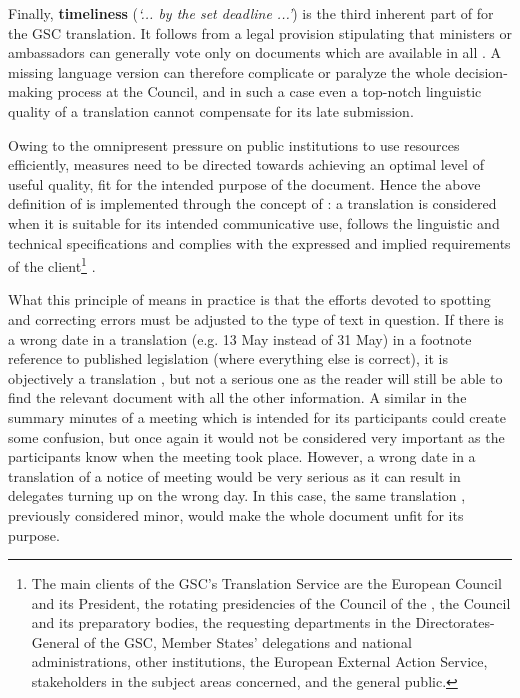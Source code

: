 \documentclass[output=paper]{langsci/langscibook}
\begin{document}
Finally, \textbf{timeliness} (\textit{‘... by the set deadline ...’}) is the third inherent part of  for the GSC translation. It follows from a legal provision stipulating that ministers or ambassadors can generally vote only on documents which are available in all . A missing language version can therefore complicate or paralyze the whole decision-making process at the Council, and in such a case even a top-notch linguistic quality of a translation cannot compensate for its late submission.

Owing to the omnipresent pressure on public institutions to use resources efficiently,  measures need to be directed towards achieving an optimal level of useful quality, fit for the intended purpose of the document. Hence the above definition of  is implemented through the concept of : a translation is considered  when it is suitable for its intended communicative use, follows the linguistic and technical specifications and complies with the expressed and implied requirements of the client\footnote{The main clients of the GSC's Translation Service are the European Council and its President, the rotating presidencies of the Council of the , the Council and its preparatory bodies, the requesting departments in the Directorates-General of the GSC, Member States' delegations and national administrations, other  institutions, the European External Action Service, stakeholders in the subject areas concerned, and the general public.} \citep[36]{Council2015}. 

What this principle of  means in practice is that the efforts devoted to spotting and correcting errors must be adjusted to the type of text in question. If there is a wrong date in a translation (e.g. 13 May instead of 31 May) in a footnote reference to published legislation (where everything else is correct), it is objectively a translation , but not a serious one as the reader will still be able to find the relevant document with all the other information. A similar  in the summary minutes of a meeting which is intended for its participants could create some confusion, but once again it would not be considered very important as the participants know when the meeting took place. However, a wrong date in a translation of a notice of meeting would be very serious as it can result in delegates turning up on the wrong day. In this case, the same translation , previously considered minor, would make the whole document unfit for its purpose.
\end{document}
